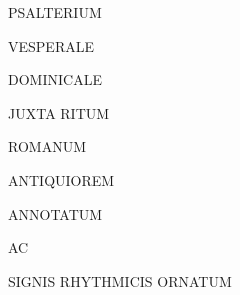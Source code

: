 






\begin{center}

\color{benred8}

{\fontsize{2.660cm}{5 em}\selectfont

PSALTERIUM

}

\vspace*{15 pt}

{\fontsize{2.975cm}{5 em}\selectfont

VESPERALE

}

\vspace*{15 pt}

{\fontsize{1.5cm}{1 em}\selectfont

DOMINICALE

\vspace*{3.2 mm}

JUXTA RITUM

\vspace*{1.2 mm}

ROMANUM

\vspace*{3.0 mm}

ANTIQUIOREM

}

\vspace*{2 mm}

\begin{Huge}

ANNOTATUM

\end{Huge}\begin{Large}

AC

\vspace*{-1.0 mm}

\end{Large}\begin{Huge}

SIGNIS RHYTHMICIS ORNATUM

\end{Huge}

\vspace*{2 mm}


\end{center}
